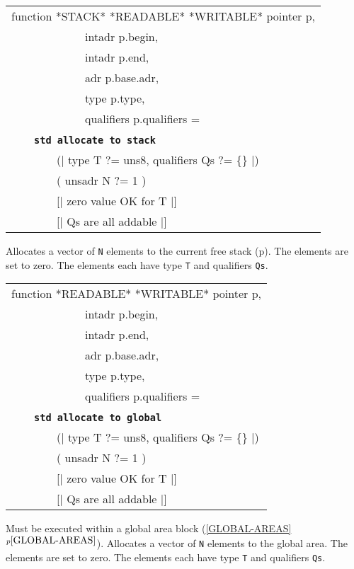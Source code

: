 \documentclass[12pt]{article}
\makeatletter
\newcommand{\TT}[1]{{\tt \bfseries #1}}
\newcommand{\ttstdkey}[1]{\TT{std #1}\index{#1@{\tt std #1}}}
\newcommand{\itemref}[1]{\ref{#1}$^{p\pageref{#1}}$}
\newcommand{\pagref}[1]{p\pageref{#1}}
\newenvironment{indpar}[1][0.3in]%
	{\begin{list}{}%
		     {\setlength{\itemsep}{0in}%
		      \setlength{\topsep}{0in}%
		      \setlength{\parsep}{1ex}%
		      \setlength{\labelwidth}{#1}%
		      \setlength{\leftmargin}{#1}%
		      \addtolength{\leftmargin}{\labelsep}}%
	 \item}%
	{\end{list}}
\makeatother
\begin{document}
\begin{indpar}


{\tt\begin{tabular}{@{}l}
function *STACK* *READABLE* *WRITABLE* pointer p, \\
~~~~~~~~~~~~~intadr p.begin, \\
~~~~~~~~~~~~~intadr p.end, \\
~~~~~~~~~~~~~adr p.base.adr, \\
~~~~~~~~~~~~~type p.type, \\
~~~~~~~~~~~~~qualifiers p.qualifiers = \\
~~~~\ttstdkey{allocate to stack} \\
~~~~~~~~(| type T ?= uns8, qualifiers Qs ?= \{\} |) \\
~~~~~~~~( unsadr N ?= 1 ) \\
~~~~~~~~[| zero value OK for T |] \\
~~~~~~~~[| Qs are all addable |] \\
\end{tabular}}\label{POINTER-ALLOCATE-TO-STACK}

\begin{indpar}
Allocates a vector of {\tt N} elements to the current free
stack (\pagref{FREE-STACK}).  The elements are set to zero.
The elements each have type {\tt T} and qualifiers {\tt Qs}.
\end{indpar}

{\tt\begin{tabular}{@{}l}
function *READABLE* *WRITABLE* pointer p, \\
~~~~~~~~~~~~~intadr p.begin, \\
~~~~~~~~~~~~~intadr p.end, \\
~~~~~~~~~~~~~adr p.base.adr, \\
~~~~~~~~~~~~~type p.type, \\
~~~~~~~~~~~~~qualifiers p.qualifiers = \\
~~~~\ttstdkey{allocate to global} \\
~~~~~~~~(| type T ?= uns8, qualifiers Qs ?= \{\} |) \\
~~~~~~~~( unsadr N ?= 1 ) \\
~~~~~~~~[| zero value OK for T |] \\
~~~~~~~~[| Qs are all addable |] \\
\end{tabular}}\label{POINTER-ALLOCATE-TO-GLOBAL}

\begin{indpar}
Must be executed within a global area block (\itemref{GLOBAL-AREAS}).
Allocates a vector of {\tt N} elements to the global area.
The elements are set to zero.
The elements each have type {\tt T} and qualifiers {\tt Qs}.
\end{indpar}


\end{indpar}
\end{document}
